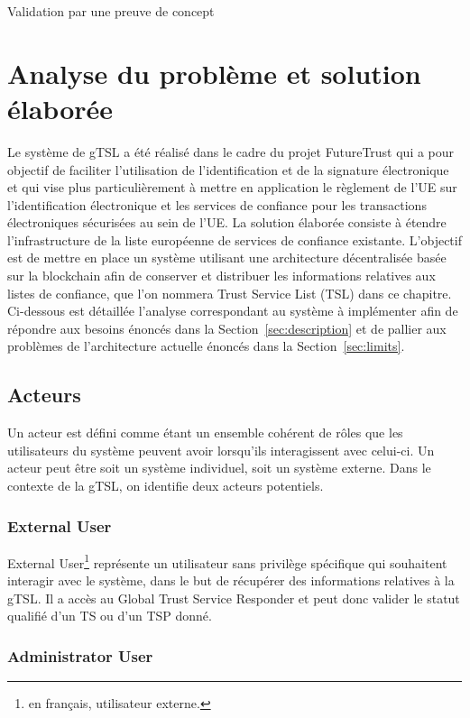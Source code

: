 \documentclass{tnreport}
\begin{document}
Validation par une preuve de concept

\chapter{Analyse du problème et solution élaborée}
\label{sec:analyse}

Le système de gTSL a été réalisé dans le cadre du projet FutureTrust qui a pour objectif de faciliter l'utilisation de l'identification et de la signature électronique et qui vise plus particulièrement à mettre en application le règlement de l'UE sur l'identification électronique et les services de confiance pour les transactions électroniques sécurisées au sein de l'UE.
La solution élaborée consiste à étendre l'infrastructure de la liste européenne de services de confiance existante. L'objectif est de mettre en place un système utilisant une architecture décentralisée basée sur la blockchain afin de conserver et distribuer les informations relatives aux listes de confiance, que l'on nommera Trust Service List (TSL) dans ce chapitre. Ci-dessous est détaillée l'analyse correspondant au système à implémenter afin de répondre aux besoins énoncés dans la Section~\ref{sec:description} et de pallier aux problèmes de l'architecture actuelle énoncés dans la Section~\ref{sec:limits}.

\section{Acteurs}

Un acteur est défini comme étant un ensemble cohérent de rôles que les utilisateurs du système peuvent avoir lorsqu'ils interagissent avec celui-ci. Un acteur peut être soit un système individuel, soit un système externe. Dans le contexte de la gTSL, on identifie deux acteurs potentiels.

\subsection{External User}

External User\footnote{en français, utilisateur externe.} représente un utilisateur sans privilège spécifique qui souhaitent interagir avec le système, dans le but de récupérer des informations relatives à la gTSL. Il a accès au Global Trust Service Responder et peut donc valider le statut qualifié d'un TS ou d'un TSP donné.

\subsection{Administrator User}
\end{document}
